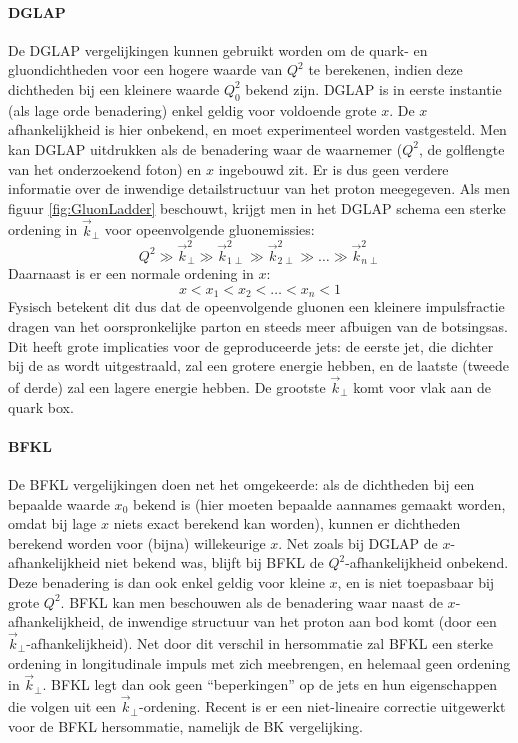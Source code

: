 \documentclass[a4paper,11pt]{article}
\numberwithin{equation}{section} %
\begin{document}
      \paragraph{DGLAP} \label{sec:DGLAP}
De DGLAP vergelijkingen kunnen gebruikt worden om de quark- en gluondichtheden voor een hogere waarde van $Q^2$ te berekenen, indien deze dichtheden bij een kleinere waarde $Q_0^2$ bekend zijn.
DGLAP is in eerste instantie (als lage orde benadering) enkel geldig voor voldoende grote $x$.
De $x$ afhankelijkheid is hier onbekend, en moet experimenteel worden vastgesteld.
Men kan DGLAP uitdrukken als de benadering waar de waarnemer ($Q^2$, de golflengte van het onderzoekend foton) en $x$ ingebouwd zit.
Er is dus geen verdere informatie over de inwendige detailstructuur van het proton meegegeven.
Als men figuur \ref{fig:GluonLadder} beschouwt, krijgt men in het DGLAP schema een sterke ordening in $\vec{k}_\perp$ voor opeenvolgende gluonemissies:
\begin{equation}
Q^2 \gg \vec{k}_\perp^2 \gg \vec{k}_{1\perp}^2 \gg \vec{k}_{2\perp}^2 \gg \hdots \gg \vec{k}_{n\perp}^2
\end{equation}
Daarnaast is er een normale ordening in $x$:
\begin{equation}
x < x_1 < x_2 < \hdots < x_n < 1
\end{equation}
Fysisch betekent dit dus dat de opeenvolgende gluonen een kleinere impulsfractie dragen van het oorspronkelijke parton en steeds meer afbuigen van de botsingsas.
Dit heeft grote implicaties voor de geproduceerde jets: de eerste jet, die dichter bij de as wordt uitgestraald, zal een grotere energie hebben, en de laatste (tweede of derde) zal een lagere energie hebben.
De grootste $\vec{k}_\perp$ komt voor vlak aan de quark box.

      \paragraph{BFKL}
De BFKL vergelijkingen doen net het omgekeerde: als de dichtheden bij een bepaalde waarde $x_0$ bekend is (hier moeten bepaalde aannames gemaakt worden, omdat bij lage $x$ niets exact berekend kan worden), kunnen er dichtheden berekend worden voor (bijna) willekeurige $x$.
Net zoals bij DGLAP de $x$-afhankelijkheid niet bekend was, blijft bij BFKL de $Q^2$-afhankelijkheid onbekend.
Deze benadering is dan ook enkel geldig voor kleine $x$, en is niet toepasbaar bij grote $Q^2$.
BFKL kan men beschouwen als de benadering waar naast de $x$-afhankelijkheid, de inwendige structuur van het proton aan bod komt (door een $\vec{k}_\perp$-afhankelijkheid).
Net door dit verschil in hersommatie zal BFKL een sterke ordening in longitudinale impuls met zich meebrengen, en helemaal geen ordening in $\vec{k}_\perp$.
BFKL legt dan ook geen “beperkingen” op de jets en hun eigenschappen die volgen uit een $\vec{k}_\perp$-ordening.
Recent is er een niet-lineaire correctie uitgewerkt voor de BFKL hersommatie, namelijk de BK vergelijking.
\end{document}
